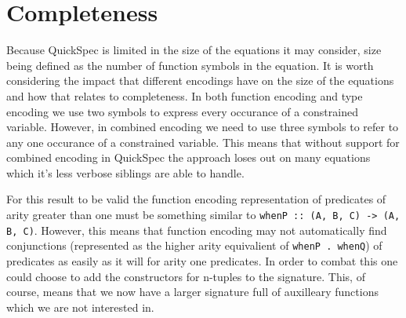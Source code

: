 \section{Completeness}

Because QuickSpec is limited in the size
of the equations it may consider, size being
defined as the number of function symbols in the
equation. It is worth considering the impact that
different encodings have on the size of the equations 
and how that relates to completeness. In both
function encoding and type encoding we use two
symbols to express every occurance of
a constrained variable. However, in
combined encoding we need to use three symbols
to refer to any one occurance of a constrained variable.
This means that without support for combined encoding in
QuickSpec the approach loses out on many equations which
it's less verbose siblings are able to handle.

For this result to be valid the function encoding representation
of predicates of arity greater than one must be something similar to
\texttt{whenP :: (A, B, C) -> (A, B, C)}. However, this means that
function encoding may not automatically find conjunctions (represented as
the higher arity equivalient of \texttt{whenP . whenQ}) of predicates
as easily as it will for arity one predicates. In order to combat this
one could choose to add the constructors for n-tuples to the signature. This,
of course, means that we now have a larger signature full of auxilleary functions
which we are not interested in.
